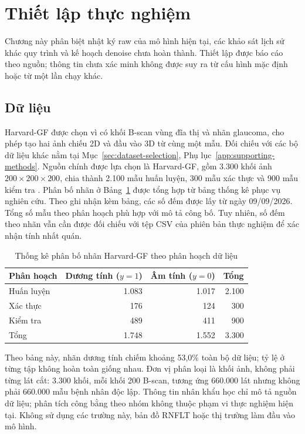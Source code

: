 \documentclass[14pt,a4paper,oneside]{extreport}
\begin{document}
\section{Thiết lập thực nghiệm}
\label{sec:experiment-setup}
Chương này phân biệt nhật ký raw của mô hình hiện tại, các khảo sát
lịch sử khác quy trình và kế hoạch denoise chưa hoàn thành. Thiết lập
được báo cáo theo nguồn; thông tin chưa xác minh không được suy ra
từ cấu hình mặc định hoặc từ một lần chạy khác.

\subsection{Dữ liệu}
Harvard-GF được chọn vì có khối B-scan vùng đĩa thị và nhãn glaucoma,
cho phép tạo hai ảnh chiếu 2D và đầu vào 3D từ cùng một mẫu.
Đối chiếu với các bộ dữ liệu khác nằm tại Mục~\ref{sec:dataset-selection},
Phụ lục~\ref{app:supporting-methods}.
Nguồn chính được lựa chọn là Harvard-GF, gồm 3.300 khối ảnh
$200\times200\times200$, chia thành 2.100 mẫu huấn luyện, 300 mẫu
xác thực và 900 mẫu kiểm tra \cite{harvardgfRepo,harvardgfHF}.
Phân bố nhãn ở Bảng~\ref{tab:harvard-label-splits} được tổng hợp từ
bảng thống kê phục vụ nghiên cứu. Theo ghi nhận kèm bảng, các số
đếm được lấy từ  ngày 09/09/2026.
Tổng số mẫu theo phân hoạch phù hợp với mô tả công bố. Tuy nhiên,
số đếm theo nhãn vẫn cần được đối chiếu với tệp CSV của phiên bản
thực nghiệm để xác nhận tính nhất quán.

\begin{table}[htbp]
  \centering
  \caption{Thống kê phân bố nhãn Harvard-GF theo phân hoạch dữ liệu}
  \label{tab:harvard-label-splits}
  \begin{tabular}{@{}lrrr@{}}
    \toprule
    \textbf{Phân hoạch} & \textbf{Dương tính ($y=1$)} &
    \textbf{Âm tính ($y=0$)} & \textbf{Tổng}\\
    \midrule
    Huấn luyện & 1.083 & 1.017 & 2.100\\
    Xác thực & 176 & 124 & 300\\
    Kiểm tra & 489 & 411 & 900\\
    \midrule
    Tổng & 1.748 & 1.552 & 3.300\\
    \bottomrule
  \end{tabular}
\end{table}

Theo bảng này, nhãn dương tính chiếm khoảng 53,0\% toàn bộ dữ liệu;
tỷ lệ ở từng tập không hoàn toàn giống nhau. Đơn vị phân loại là
khối ảnh, không phải từng lát cắt: 3.300 khối, mỗi khối 200 B-scan,
tương ứng 660.000 lát nhưng không phải 660.000 mẫu bệnh nhân độc lập.
Thông tin nhân khẩu học chỉ mô tả nguồn dữ liệu; phân tích công bằng
theo nhóm không thuộc phạm vi thực nghiệm hiện tại. Không sử dụng
các trường này, bản đồ RNFLT hoặc thị trường làm đầu vào mô hình.
\end{document}
